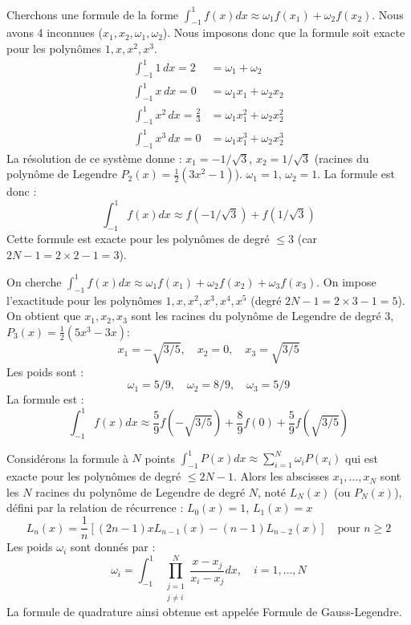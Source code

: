 \begin{example}
Cherchons une formule de la forme $\int_{-1}^{1} f(x) dx \approx \omega_1 f(x_1) + \omega_2 f(x_2)$.
Nous avons 4 inconnues ($x_1, x_2, \omega_1, \omega_2$). Nous imposons donc que la formule soit exacte pour les polynômes $1, x, x^2, x^3$.
\begin{align*} \int_{-1}^{1} 1 \, dx = 2 &= \omega_1 + \omega_2 \\ \int_{-1}^{1} x \, dx = 0 &= \omega_1 x_1 + \omega_2 x_2 \\ \int_{-1}^{1} x^2 \, dx = \frac{2}{3} &= \omega_1 x_1^2 + \omega_2 x_2^2 \\ \int_{-1}^{1} x^3 \, dx = 0 &= \omega_1 x_1^3 + \omega_2 x_2^3 \end{align*}
La résolution de ce système donne :
$x_1 = -1/\sqrt{3}$, $x_2 = 1/\sqrt{3}$ (racines du polynôme de Legendre $P_2(x) = \frac{1}{2}(3x^2-1)$).
$\omega_1 = 1$, $\omega_2 = 1$.
La formule est donc :
\[ \int_{-1}^{1} f(x) dx \approx f(-1/\sqrt{3}) + f(1/\sqrt{3}) \]
Cette formule est exacte pour les polynômes de degré $\le 3$ (car $2N-1 = 2 \times 2 - 1 = 3$).
\end{example}

\begin{example}
On cherche $\int_{-1}^{1} f(x) dx \approx \omega_1 f(x_1) + \omega_2 f(x_2) + \omega_3 f(x_3)$.
On impose l'exactitude pour les polynômes $1, x, x^2, x^3, x^4, x^5$ (degré $2N-1 = 2 \times 3 - 1 = 5$).
On obtient que $x_1, x_2, x_3$ sont les racines du polynôme de Legendre de degré 3, $P_3(x) = \frac{1}{2}(5x^3-3x)$:
\[ x_1 = -\sqrt{3/5}, \quad x_2 = 0, \quad x_3 = \sqrt{3/5} \]
Les poids sont :
\[ \omega_1 = 5/9, \quad \omega_2 = 8/9, \quad \omega_3 = 5/9 \]
La formule est :
\[ \int_{-1}^{1} f(x) dx \approx \frac{5}{9} f(-\sqrt{3/5}) + \frac{8}{9} f(0) + \frac{5}{9} f(\sqrt{3/5}) \]
\end{example}

\begin{proposition}
Considérons la formule à $N$ points $\int_{-1}^{1} P(x) dx \approx \sum_{i=1}^{N} \omega_i P(x_i)$ qui est exacte pour les polynômes de degré $\le 2N-1$.
Alors les abscisses $x_1, \dots, x_N$ sont les $N$ racines du polynôme de Legendre de degré $N$, noté $L_N(x)$ (ou $P_N(x)$), défini par la relation de récurrence :
$L_0(x) = 1$, $L_1(x) = x$
\[ L_n(x) = \frac{1}{n} \left[ (2n-1)x L_{n-1}(x) - (n-1)L_{n-2}(x) \right] \quad \text{pour } n \ge 2 \]
Les poids $\omega_i$ sont donnés par :
\[ \omega_i = \int_{-1}^{1} \prod_{\substack{j=1 \\ j \neq i}}^{N} \frac{x-x_j}{x_i-x_j} dx, \quad i=1, \dots, N \]
La formule de quadrature ainsi obtenue est appelée Formule de Gauss-Legendre.
\end{proposition}

